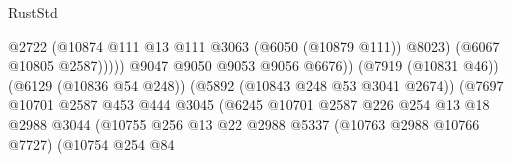 \begin{lexlean}{RustStd}
\begin{coremodule}
                                                            @2722
                                                            (@10874
                                                              @111
                                                              @13
                                                              @111
                                                              @3063
                                                              (@6050 (@10879 @111))
                                                              @8023)
                                                            (@6067 @10805 @2587)))))
                                                    @9047
                                                    @9050
                                                    @9053
                                                    @9056
                                                    @6676))
                                                (@7919 (@10831 @46))
                                                (@6129 (@10836 @54 @248))
                                                (@5892 (@10843 @248 @53 @3041 @2674))
                                                (@7697
                                                  @10701
                                                  @2587
                                                  @453
                                                  @444
                                                  @3045
                                                  (@6245
                                                    @10701
                                                    @2587
                                                    @226
                                                    @254
                                                    @13
                                                    @18
                                                    @2988
                                                    @3044
                                                    (@10755
                                                      @256
                                                      @13
                                                      @22
                                                      @2988
                                                      @5337
                                                      (@10763 @2988 @10766 @7727)
                                                      (@10754
                                                        @254
                                                        @84

\end{coremodule}
\end{lexlean}
